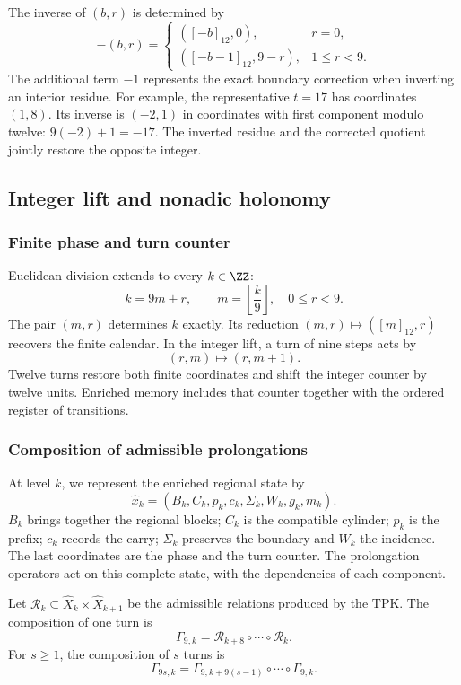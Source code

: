 The inverse of $(b,r)$ is determined by
\[
 -(b,r)=
 \begin{cases}
 ([-b]_{12},0),&r=0,\\
 ([-b-1]_{12},9-r),&1\leq r<9.
 \end{cases}
\]
The additional term $-1$ represents the exact boundary correction when
inverting an interior residue. For example, the representative $t=17$ has
coordinates $(1,8)$. Its inverse is $(-2,1)$ in coordinates with
first component modulo twelve: $9(-2)+1=-17$. The inverted residue and
the corrected quotient jointly restore the opposite integer.

\subsection{Integer lift and nonadic holonomy}

\subsubsection{Finite phase and turn counter}

Euclidean division extends to every $k\in\ZZ$:
\[
 k=9m+r,\qquad m=\left\lfloor\frac k9\right\rfloor,
 \quad0\leq r<9.
\]
The pair $(m,r)$ determines $k$ exactly. Its reduction
$(m,r)\mapsto([m]_{12},r)$ recovers the finite calendar. In the
integer lift, a turn of nine steps acts by
\begin{equation}
 (r,m)\longmapsto(r,m+1).
 \label{eq:cal-vuelta-entera}
\end{equation}
Twelve turns restore both finite coordinates and shift the
integer counter by twelve units. Enriched memory includes that
counter together with the ordered register of transitions.

\subsubsection{Composition of admissible prolongations}

At level $k$, we represent the enriched regional state by
\[
 \widehat x_k=(B_k,C_k,p_k,c_k,\Sigma_k,W_k,g_k,m_k).
\]
$B_k$ brings together the regional blocks; $C_k$ is the compatible cylinder;
$p_k$ is the prefix; $c_k$ records the carry; $\Sigma_k$ preserves the
boundary and $W_k$ the incidence. The last coordinates are the phase and
the turn counter. The prolongation operators act on
this complete state, with the dependencies of each component.

\begin{definicion}
Let $\mathcal R_k\subseteq\widehat X_k\times\widehat X_{k+1}$ be
the admissible relations produced by the TPK. The composition of one
turn is
\[
 \Gamma_{9,k}=\mathcal R_{k+8}\circ\cdots\circ\mathcal R_k.
\]
For $s\geq1$, the composition of $s$ turns is
\[
 \Gamma_{9s,k}=
 \Gamma_{9,k+9(s-1)}\circ\cdots\circ\Gamma_{9,k}.
\]
\end{definicion}

